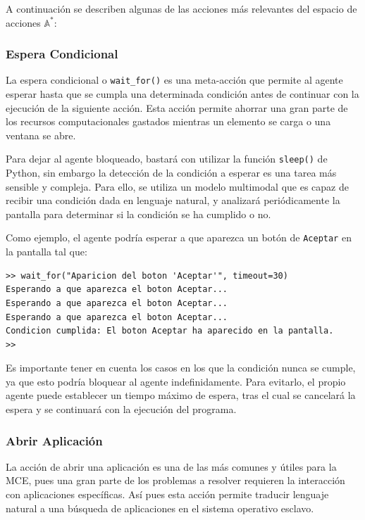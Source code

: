 A continuación se describen algunas de las acciones más relevantes
del espacio de acciones \(\mathbb{A}^*\):

\subsubsection{Espera Condicional}
La espera condicional o \texttt{wait\_for()} es una meta-acción que permite al agente
esperar hasta que se cumpla una determinada condición antes de continuar con la
ejecución de la siguiente acción. Esta acción permite ahorrar una gran parte de los
recursos computacionales gastados mientras un elemento se carga o una ventana se abre.

Para dejar al agente bloqueado, bastará con utilizar la función \texttt{sleep()}
de Python, sin embargo la detección de la condición a esperar es una tarea más
sensible y compleja. Para ello, se utiliza un modelo multimodal que es capaz de
recibir una condición dada en lenguaje natural, y analizará periódicamente
la pantalla para determinar si la condición se ha cumplido o no.

Como ejemplo, el agente podría esperar a que aparezca un botón de
\texttt{Aceptar} en la pantalla tal que:

\begin{lstlisting}[caption={Espera condicional}, label={cod:wait_for}]
>> wait_for("Aparicion del boton 'Aceptar'", timeout=30)
Esperando a que aparezca el boton Aceptar...
Esperando a que aparezca el boton Aceptar...
Esperando a que aparezca el boton Aceptar...
Condicion cumplida: El boton Aceptar ha aparecido en la pantalla.
>> 
\end{lstlisting}

Es importante tener en cuenta los casos en los que la condición nunca se
cumple, ya que esto podría bloquear al agente indefinidamente. Para evitarlo,
el propio agente puede establecer un tiempo máximo de espera, tras el cual
se cancelará la espera y se continuará con la ejecución del programa.


\subsubsection{Abrir Aplicación}
La acción de abrir una aplicación es una de las más comunes y útiles para
la MCE, pues una gran parte de los problemas a resolver requieren la
interacción con aplicaciones específicas. Así pues esta acción permite traducir
lenguaje natural a una búsqueda de aplicaciones en el sistema operativo esclavo.

